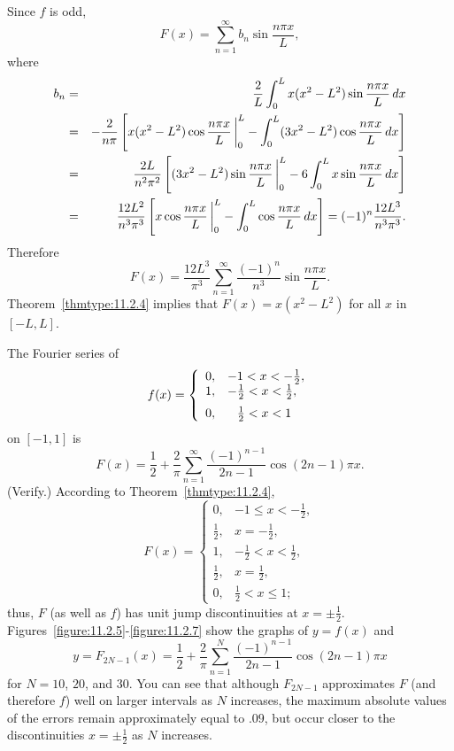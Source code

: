 \begin{examplesolution}
\solution Since $f$ is odd,
\[
  F(x)=\sum_{n=1}^{\infty}b_{n}\sin\frac{n\pi x}{L},
\]
where
\begin{eqnarray*}
  b_{n} & = & \frac{2}{L}\int_{0}^{L}x(x^{2}-L^{2})\sin\frac{n\pi x}{L}\,dx                                                            \\
        & = & -\frac{2}{n\pi}\left[x(x^{2}-L^{2})\cos\frac{n\pi x}{L}\,\bigg|_{0}^{L}-\int_{0}^{L}(3x^{2}-L^{2})\cos\frac{n\pi x}{L}\,dx\right] \\
        & = & \frac{2L}{n^{2}\pi^{2}}\left[(3x^{2}-L^{2})\sin\frac{n\pi x}{L}\,\bigg|_{0}^{L}-6\int_{0}^{L}x\sin\frac{n\pi x}{L}\,dx\right]     \\
        & = & \frac{12L^{2}}{n^{3}\pi^{3}}\left[x\cos\frac{n\pi x}{L}\,\bigg|_{0}^{L}-\int_{0}^{L}\cos\frac{n\pi x}{L}\,dx\right]=(-1)^{n}\frac{12L^{3}}{n^{3}\pi^{3}}.
\end{eqnarray*}
Therefore
\[
  F(x)=\frac{12L^{3}}{\pi^{3}}\sum_{n=1}^{\infty}\frac{(-1)^{n}}{n^{3}}\sin\frac{n\pi x}{L}.
\]
Theorem~\ref{thmtype:11.2.4} implies that $F(x)=x(x^{2}-L^{2})$ for all $x$ in $[-L,L]$.
\end{examplesolution}

\begin{example}
  \label{example:11.2.7}\rm The Fourier series of
  \[
    f(x)=\left\{
    \begin{array}{cl}
      0, & -1<x<-\frac{1}{2},           \\
      1, & -\frac{1}{2}<x<\frac{1}{2},  \\[2\jot]
      0, & \phantom{-}{\frac{1}{2}}<x<1
    \end{array}\right.
  \]
  on $[-1,1]$ is
  \[
    F(x)=\frac{1}{2}+\frac{2}{\pi}\sum_{n=1}^{\infty}\frac{(-1)^{n-1}}{2n-1}\cos(2n-1)\pi x.
  \]
  (Verify.) According to Theorem~\ref{thmtype:11.2.4},
  \[
    F(x)=\left\{
    \begin{array}{cl}
      0,           & -1\le x<-\frac{1}{2},       \\
      \frac{1}{2}, & x=-\frac{1}{2},             \\
      1,           & -\frac{1}{2}<x<\frac{1}{2}, \\
      \frac{1}{2}, & x=\frac{1}{2},              \\
      0,           & \frac{1}{2}<x\le1;
    \end{array}\right.
  \]
  thus, $F$ (as well as $f$) has unit jump discontinuities at $x=\pm\frac{1}{2}$.
  Figures~\ref{figure:11.2.5}-\ref{figure:11.2.7} show the graphs of $y=f(x)$ and
  \[
    y=F_{2N-1}(x)=\frac{1}{2}+ \frac{2}{\pi}\sum_{n=1}^{N}\frac{(-1)^{n-1}}{2n-1}\cos(2n-1)\pi x
  \]
  for $N=10$, $20$, and $30$. You can see that although $F_{2N-1}$ approximates $F$ (and therefore
  $f$) well on larger intervals as $N$ increases, the maximum absolute values of the errors remain
  approximately equal to $.09$, but occur closer to the discontinuities $x=\pm\frac{1}{2}$ as $N$
  increases.
\end{example}

